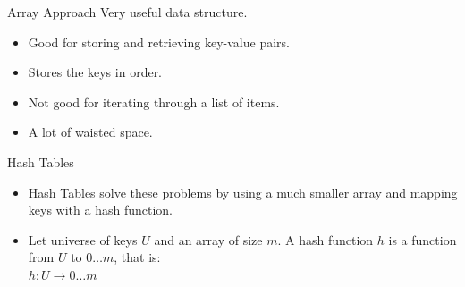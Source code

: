 \documentclass[14pt,aspectratio=1610]{beamer}
\begin{document}
\begin{frame}{Array Approach}
  Very useful data structure.
  \begin{itemize}
  \item
    Good for storing and retrieving key-value pairs.
  \item
    Stores the keys in order.
  \item
    Not good for iterating through a list of items.
  \item
    A lot of waisted space.
  \end{itemize}
\end{frame}

\begin{frame}{Hash Tables}
  \begin{itemize}
  \item
    Hash Tables solve these problems by using a much smaller array and mapping keys with a hash function.
  \item
    Let universe of keys \(U\) and an array of size \(m\). A hash function \(h\) is a function from \(U\) to \(0\ldots{}m\), that is:\\
    \(h : U \to 0\ldots{}m\)
  \end{itemize}
    





        


\end{frame}
\end{document}

